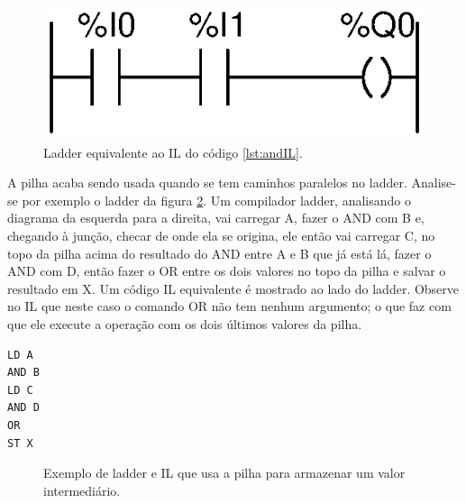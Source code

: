 \begin{figure}[hbt]
	\centering
	\includegraphics[scale=0.6]{figuras/ladder_AND}
	\caption{Ladder equivalente ao IL do código \ref{lst:andIL}.}
	\label{fig:ladder_AND}
\end{figure}

A pilha acaba sendo usada quando se tem caminhos paralelos no ladder. Analise-se por exemplo o ladder da figura \ref{fig:ladder_ABorCD}. Um compilador ladder, analisando o diagrama da esquerda para a direita, vai carregar A, fazer o AND com B e, chegando à junção, checar de onde ela se origina, ele então vai carregar C, no topo da pilha acima do resultado do AND entre A e B que já está lá, fazer o AND com D, então fazer o OR entre os dois valores no topo da pilha e salvar o resultado em X. Um código IL equivalente é mostrado ao lado do ladder. Observe no IL que neste caso o comando OR não tem nenhum argumento; o que faz com que ele execute a operação com os dois últimos valores da pilha.

\newsavebox\ladderABorCD
\begin{lrbox}{\ladderABorCD}
\begin{minipage}[b]{0.3\textwidth}
\begin{lstlisting}
LD A
AND B
LD C
AND D
OR
ST X
\end{lstlisting}
\end{minipage}
\end{lrbox}

\begin{figure}[hbt]
	\centering
	\qquad\qquad
	\subfloat[IL]{\centering\usebox{\ladderABorCD}
	}
	\caption{Exemplo de ladder e IL que usa a pilha para armazenar um valor intermediário.}
	\label{fig:ladder_ABorCD}
\end{figure}


